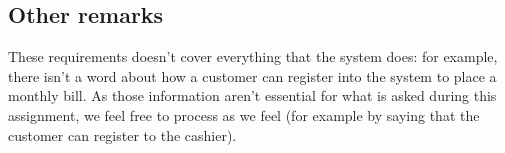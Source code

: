 \subsection{Other remarks}

These requirements doesn't cover everything that the system does: for example,
there isn't a word about how a customer can register into the system to place
a monthly bill. As those information aren't essential for what is asked during
this assignment, we feel free to process as we feel (for example by saying that
the customer can register to the cashier).
